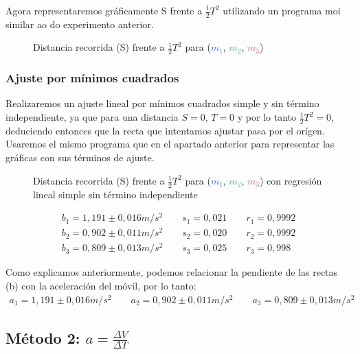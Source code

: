 \documentclass[12pt, a4paper, titlepage]{article}
\begin{document}
  Agora representaremos gráficamente S frente a $\frac{1}{2}T^2$ utilizando un programa moi similar ao do experimento anterior.

  \begin{figure}[H]
    \centering
     
    
    \caption{Distancia recorrida (S) frente a $\frac{1}{2}T^2$ para  (\textcolor{RoyalBlue}{$m_1$}, \textcolor{MediumSeaGreen}{$m_2$}, \textcolor{IndianRed}{$m_3$})}
  \end{figure}

  \subsubsection{Ajuste por mínimos cuadrados}

  Realizaremos un ajuste lineal por mínimos cuadrados simple y sin término independiente, ya que para una distancia $S=0$, $T=0$ y por lo tanto $\frac{1}{2}T^2 = 0$, deduciendo entonces que la recta que intentamos ajustar pasa por el orígen. Usaremos el mismo programa que en el apartado anterior para representar las gráficas con sus términos de ajuste.

  \begin{figure}[H]
    \centering
     
    
    \caption{Distancia recorrida (S) frente a $\frac{1}{2}T^2$ para  (\textcolor{RoyalBlue}{$m_1$}, \textcolor{MediumSeaGreen}{$m_2$}, \textcolor{IndianRed}{$m_3$}) con regresión lineal simple sin término independiente}
  \end{figure}
  \begin{gather*}
    b_1 = 1,191 \pm 0,016 m/s^2 \qquad s_1 = 0,021 \qquad r_1 = 0,9992 \\
    b_2 = 0,902 \pm 0,011 m/s^2 \qquad s_2 = 0,020 \qquad r_2 = 0,9992 \\
    b_3 = 0,809 \pm 0,013 m/s^2 \qquad s_3 = 0,025 \qquad r_3 = 0,998
  \end{gather*}

  Como explicamos anteriormente, podemos relacionar la pendiente de las rectas (b) con la aceleración del móvil, por lo tanto:
  \begin{gather*}
    a_1 = 1,191 \pm 0,016 m/s^2 \qquad a_2 = 0,902 \pm 0,011 m/s^2 \qquad a_3 = 0,809 \pm 0,013 m/s^2
  \end{gather*}

  \newpage
  \subsection{Método 2: $a = \frac{\Delta V}{\Delta T}$}
\end{document}
